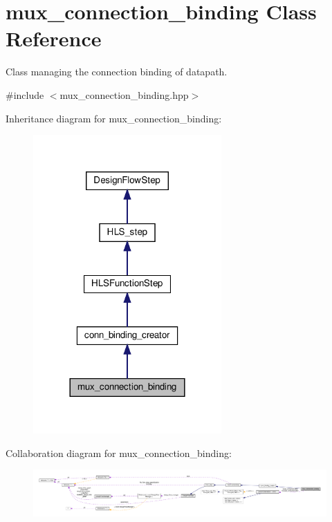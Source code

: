 \hypertarget{classmux__connection__binding}{}\section{mux\+\_\+connection\+\_\+binding Class Reference}
\label{classmux__connection__binding}


Class managing the connection binding of datapath.  




{\ttfamily \#include $<$mux\+\_\+connection\+\_\+binding.\+hpp$>$}



Inheritance diagram for mux\+\_\+connection\+\_\+binding\+:
\nopagebreak
\begin{figure}[H]
\begin{center}
\leavevmode
\includegraphics[width=204pt]{df/d8e/classmux__connection__binding__inherit__graph}
\end{center}
\end{figure}


Collaboration diagram for mux\+\_\+connection\+\_\+binding\+:
\nopagebreak
\begin{figure}[H]
\begin{center}
\leavevmode
\includegraphics[width=350pt]{d6/ddb/classmux__connection__binding__coll__graph}
\end{center}
\end{figure}
